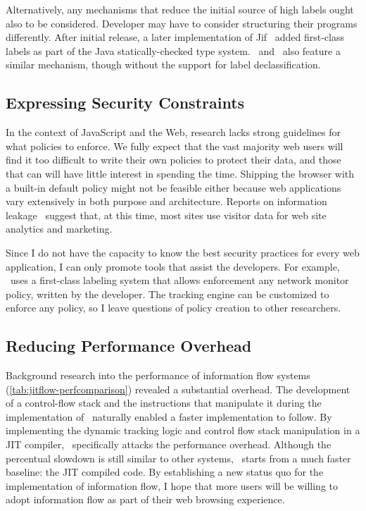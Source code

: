 Alternatively, any mechanisms that reduce the initial source of high labels ought also to be considered.
Developer may have to consider structuring their programs differently.
After initial release, a later implementation of Jif~\cite{jif} added first-class labels as part of the Java statically-checked type system.
\FlowCore\ and \JitFlow\ also feature a similar mechanism, though without the support for label declassification.

\subsection{Expressing Security Constraints}

In the context of JavaScript and the Web, research lacks strong guidelines for what policies to enforce.
We fully expect that the vast majority web users will find it too difficult to write their own policies to protect their data, and those that can will have little interest in spending the time.
Shipping the browser with a built-in default policy might not be feasible either because web applications vary extensively in both purpose and architecture.
Reports on information leakage~\cite{jang.etal+10,nikiforakis.etal+12,kerschbaumer.etal+13} suggest that, at this time, most sites use visitor data for web site analytics and marketing.

Since I do not have the capacity to know the best security practices for every web application, I can only promote tools that assist the developers.
For example, \JitFlow\ uses a first-class labeling system that allows enforcement any network monitor policy, written by the developer.
The tracking engine can be customized to enforce any policy, so I leave questions of policy creation to other researchers.

\subsection{Reducing Performance Overhead}

Background research into the performance of information flow systems (\autoref{tab:jitflow-perfcomparison}) revealed a substantial overhead.
The development of a control-flow stack and the instructions that manipulate it during the implementation of \FlowCore\ naturally enabled a faster implementation to follow.
By implementing the dynamic tracking logic and control flow stack manipulation in a JIT compiler, \JitFlow\ specifically attacks the performance overhead.
Although the percentual slowdown is still similar to other systems, \JitFlow\ starts from a much faster baseline: the JIT compiled code.
By establishing a new status quo for the implementation of information flow, I hope that more users will be willing to adopt information flow as part of their web browsing experience.

